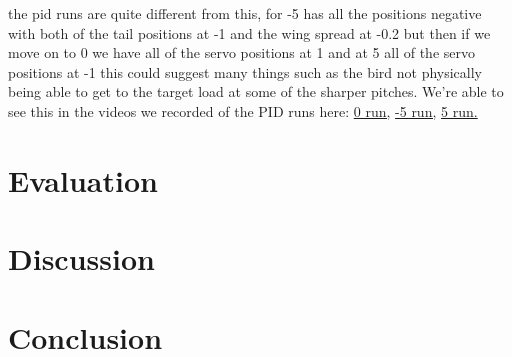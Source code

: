     the pid runs are quite different from this, for -5\textdegree{} has all the
    positions negative with both of the tail positions at -1 and the wing spread
    at -0.2 but then if we move on to 0\textdegree{} we have all of the servo
    positions at 1 and at 5\textdegree{} all of the servo positions at -1 this
    could suggest many things such as the bird not physically being able to get
    to the target load at some of the sharper pitches.
    We're able to see this in the videos we recorded of the PID runs here:
    \href{https://www.dropbox.com/scl/fo/qydc6hqrx3budknwzgmi1/ADdN0YC3AZ4ctg0SImbJqqI/Videos?preview=final_PID_0.mp4&rlkey=jcnhrcvje207wu5aaq48laen6&subfolder_nav_tracking=1&st=k76cp6vc&dl=0}{0\textdegree{} run,}
    \href{https://www.dropbox.com/scl/fo/qydc6hqrx3budknwzgmi1/ADdN0YC3AZ4ctg0SImbJqqI/Videos?preview=final_PID_neg5.mp4&rlkey=jcnhrcvje207wu5aaq48laen6&subfolder_nav_tracking=1&st=log0nht8&dl=0}{-5\textdegree{} run,}
    \href{https://www.dropbox.com/scl/fo/qydc6hqrx3budknwzgmi1/ADdN0YC3AZ4ctg0SImbJqqI/Videos?preview=final_PID_0.mp4&rlkey=jcnhrcvje207wu5aaq48laen6&subfolder_nav_tracking=1&st=k76cp6vc&dl=0}{5\textdegree{} run.}

\section{Evaluation}
\section{Discussion}
\section{Conclusion}
